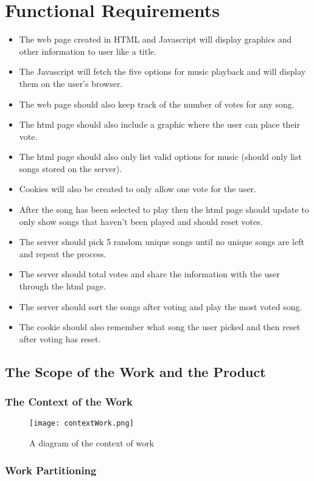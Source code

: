 \documentclass[12pt, titlepage]{article}
\begin{document}
\section{Functional Requirements}
 \begin{itemize}
 \item The web page created in HTML and Javascript will display graphics and other information to user like a title.
 \item The Javascript will fetch the five options for music playback and will display them on the user's browser.
 \item The web page should also keep track of the number of votes for any song.
 \item The html page should also include a graphic where the user can place their vote.
 \item The html page should also only list valid options for music (should only list songs stored on the server).
 \item Cookies will also be created to only allow one vote for the user.
 \item After the song has been selected to play then the html page should update to only show songs that haven't been played and should reset votes.
 \item The server should pick 5 random unique songs until no unique songs are left and repeat the process.
 \item The server should total votes and share the information with the user through the html page.
 \item The server should sort the songs after voting and play the most voted song.
 \item The cookie should also remember what song the user picked and then reset after voting has reset.
 \end{itemize}

\subsection{The Scope of the Work and the Product}

\subsubsection{The Context of the Work}
\begin{figure}[!ht]
  \caption{A diagram of the context of work}
  \centering
    \texttt{[image: contextWork.png]}
\end{figure}
\subsubsection{Work Partitioning}
\end{document}
